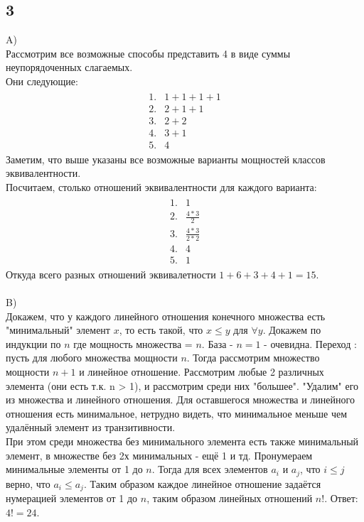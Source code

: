 		\newpage
		\subsection{3}
		A)\\
		Рассмотрим все возможные способы представить 4 в виде суммы неупорядоченных слагаемых.\\
		Они следующие:
		\begin{gather*}
			\begin{matrix}
				1. & 1 + 1 + 1 + 1\\
				2. & 2 + 1 + 1\\
				3. & 2 + 2\\
				4. & 3 + 1\\
				5. & 4
			\end{matrix}
		\end{gather*}
		Заметим, что выше указаны все возможные варианты мощностей классов эквивалентности.\\
		Посчитаем, столько отношений эквивалентности для каждого варианта:
		\begin{gather*}
			\begin{matrix}
				1. & 1\\
				2. & \frac{4*3}{2}\\
				3. & \frac{4*3}{2*2}\\
				4. & 4\\
				5. & 1
			\end{matrix}
		\end{gather*}
		Откуда всего разных отношений эквивалетности $1 + 6 + 3 + 4 + 1 = 15$.
		\\ \\
		B)\\
		Докажем, что у каждого линейного отношения конечного множества есть "минимальный" элемент $x$, то есть такой, что $x \leq y$ для $\forall y$. Докажем по индукции по $n$ где мощность множества = $n$. База - $n = 1$ - очевидна. Переход : пусть для любого множества мощности $n$. Тогда рассмотрим множество мощности $n+1$ и линейное отношение. Рассмотрим любые 2 различных элемента (они есть т.к. n > 1), и рассмотрим среди них "большее". "Удалим" его из множества и линейного отношения. Для оставшегося множества и линейного отношения есть минимальное, нетрудно  видеть, что минимальное меньше чем удалённый элемент из транзитивности.\\
		При этом среди множества без минимального элемента есть также минимальный элемент, в множестве без 2х минимальных - ещё 1 и тд. Пронумераем минимальные элементы от 1 до $n$. Тогда для всех элементов $a_i$ и $a_j$, что $i \leq j$ верно, что $a_i \leq a_j$. Таким образом каждое линейное отношение задаётся нумерацией элементов от 1 до $n$, таким образом линейных отношений $n!$. 
		Ответ: $4! = 24$.